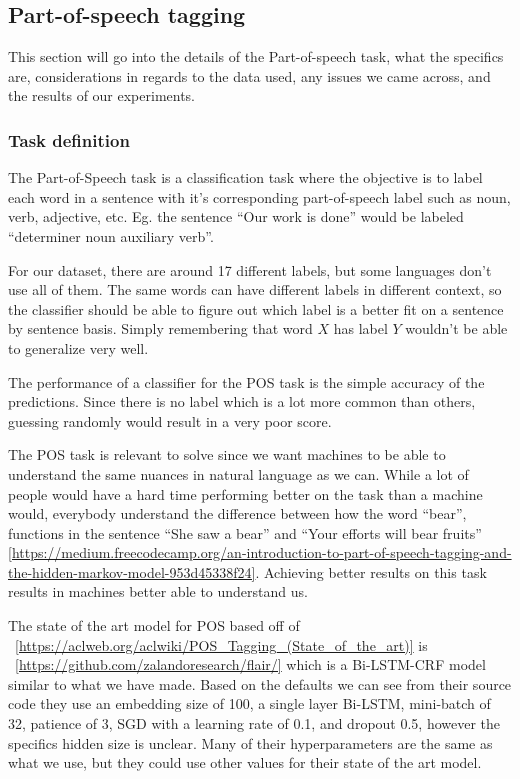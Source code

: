 
\subsection{Part-of-speech tagging}

This section will go into the details of the Part-of-speech task, what the
specifics are, considerations in regards to the data used, any issues we came
across, and the results of our experiments.

\subsubsection{Task definition}

The Part-of-Speech task is a classification task where the objective is to label
each word in a sentence with it's corresponding part-of-speech label such as
noun, verb, adjective, etc. Eg. the sentence ``Our work is done'' would be
labeled ``determiner noun auxiliary verb''.

For our dataset, there are around 17 different labels, but some languages don't
use all of them. The same words can have different labels in different context,
so the classifier should be able to figure out which label is a better fit on a
sentence by sentence basis. Simply remembering that word $X$ has label $Y$
wouldn't be able to generalize very well.

The performance of a classifier for the POS task is the simple accuracy of the
predictions. Since there is no label which is a lot more common than others,
guessing randomly would result in a very poor score. 

The POS task is relevant to solve since we want machines to be able to
understand the same nuances in natural language as we can. While a lot of people
would have a hard time performing better on the task than a machine would,
everybody understand the difference between how the word ``bear'', functions in
the sentence ``She saw a bear'' and ``Your efforts will bear fruits''
\ref{https://medium.freecodecamp.org/an-introduction-to-part-of-speech-tagging-and-the-hidden-markov-model-953d45338f24}.
Achieving better results on this task results in machines better able to
understand us.

The state of the art model for POS based off of
~\ref{https://aclweb.org/aclwiki/POS_Tagging_(State_of_the_art)} is
~\ref{https://github.com/zalandoresearch/flair/} which is a Bi-LSTM-CRF model
similar to what we have made. Based on the defaults we can see from their source
code they use an embedding size of 100, a single layer Bi-LSTM, mini-batch of
32, patience of 3, SGD with a learning rate of 0.1, and dropout 0.5, however the
specifics hidden size is unclear. Many of their hyperparameters are the same as
what we use, but they could use other values for their state of the art model. 

